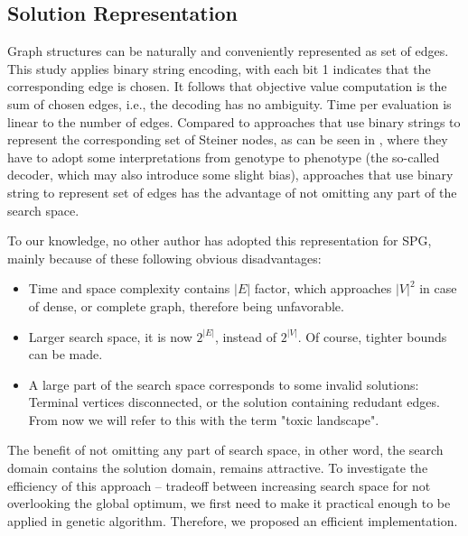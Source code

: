 \documentclass[runningheads]{llncs}
\begin{document}
\subsection{Solution Representation}

Graph structures can be naturally and conveniently represented as set of edges. This study applies binary string encoding, with each bit 1 indicates that the corresponding edge is chosen. It follows that objective value computation is the sum of chosen edges, i.e., the decoding has no ambiguity. Time per evaluation is linear to the number of edges. 
Compared to approaches that use binary strings to represent the corresponding set of Steiner nodes, as can be seen in \cite{esbensen1995computing,kapsalis1993solving}, where they have to adopt some interpretations from genotype to phenotype (the so-called decoder, which may also introduce some slight bias), approaches that use binary string to represent set of edges has the advantage of not omitting any part of the search space.

To our knowledge, no other author has adopted this representation for SPG, mainly because of these following obvious disadvantages:
\begin{itemize}
    \item Time and space complexity contains $|E|$ factor, which approaches $|V|^2$ in case of dense, or complete graph, therefore being unfavorable.
    \item Larger search space, it is now $2^{|E|}$, instead of $2^{|V|}$. Of course, tighter bounds can be made.
    \item A large part of the search space corresponds to some invalid solutions: Terminal vertices disconnected, or the solution containing redudant edges. From now we will refer to this with the term "toxic landscape".
\end{itemize}

The benefit of not omitting any part of search space, in other word, the search domain contains the solution domain, remains attractive. To investigate the efficiency of this approach -- tradeoff between increasing search space for not overlooking the global optimum, we first need to make it practical enough to be applied in genetic algorithm. Therefore, we proposed an efficient implementation.
\end{document}
